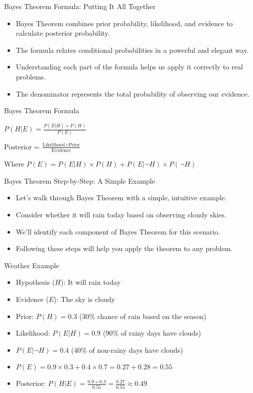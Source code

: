 \documentclass{beamer}
\begin{document}
	\begin{frame}{Bayes Theorem Formula: Putting It All Together}
		\begin{itemize}
			\item Bayes Theorem combines prior probability, likelihood, and evidence to calculate posterior probability.
			\item The formula relates conditional probabilities in a powerful and elegant way.
			\item Understanding each part of the formula helps us apply it correctly to real problems.
			\item The denominator represents the total probability of observing our evidence.
		\end{itemize}
		
		\begin{alertblock}{Bayes Theorem Formula}
			\begin{center}
				$P(H|E) = \frac{P(E|H) \times P(H)}{P(E)}$
				
				\bigskip
				
				$\text{Posterior} = \frac{\text{Likelihood} \times \text{Prior}}{\text{Evidence}}$
			\end{center}
			
			Where $P(E) = P(E|H) \times P(H) + P(E|\neg H) \times P(\neg H)$
		\end{alertblock}
	\end{frame}
	
	\begin{frame}{Bayes Theorem Step-by-Step: A Simple Example}
		\begin{itemize}
			\item Let's walk through Bayes Theorem with a simple, intuitive example.
			\item Consider whether it will rain today based on observing cloudy skies.
			\item We'll identify each component of Bayes Theorem for this scenario.
			\item Following these steps will help you apply the theorem to any problem.
		\end{itemize}
		
		\begin{exampleblock}{Weather Example}
			\begin{itemize}
				\item Hypothesis ($H$): It will rain today
				\item Evidence ($E$): The sky is cloudy
				\item Prior: $P(H) = 0.3$ (30\% chance of rain based on the season)
				\item Likelihood: $P(E|H) = 0.9$ (90\% of rainy days have clouds)
				\item $P(E|\neg H) = 0.4$ (40\% of non-rainy days have clouds)
				\item $P(E) = 0.9 \times 0.3 + 0.4 \times 0.7 = 0.27 + 0.28 = 0.55$
				\item Posterior: $P(H|E) = \frac{0.9 \times 0.3}{0.55} = \frac{0.27}{0.55} \approx 0.49$
			\end{itemize}
		\end{exampleblock}
	\end{frame}
	
\end{document}
